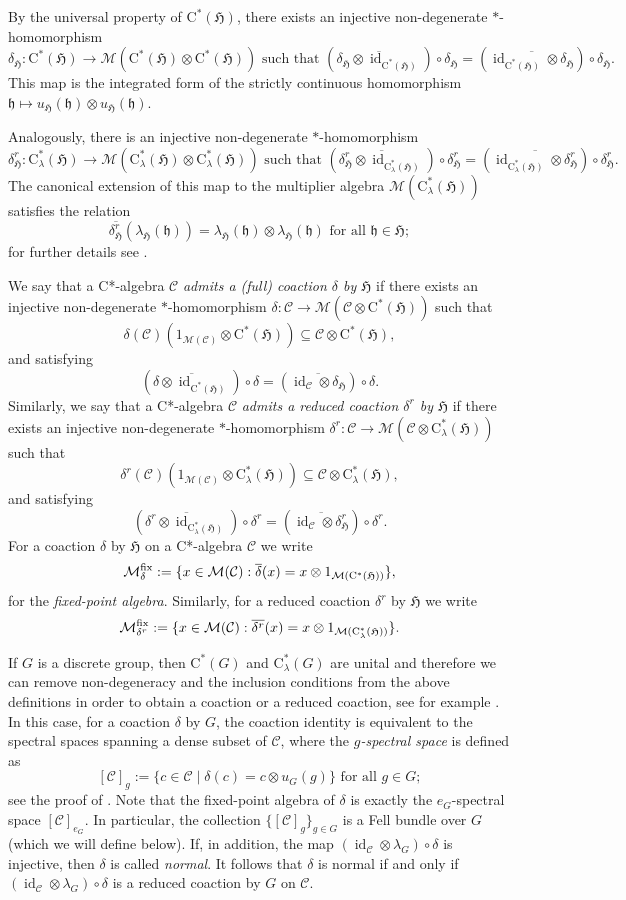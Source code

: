 \documentclass[11pt,final]{amsart}
\numberwithin{equation}{section}
\theoremstyle{plain}
\theoremstyle{definition}
\theoremstyle{remark}
\newcommand{\C}{{\mathcal{C}}}
\newcommand{\M}{{\mathcal{M}}}
\def\de{\delta}
\def\la{\lambda}
\newcommand{\fH}{{\mathfrak{H}}}
\newcommand{\fh}{{\mathfrak{h}}}
\newcommand{\foral}{\text{ for all }}
\newcommand{\ca}{\mathrm{C}^*}
\newcommand{\ol}{\overline}
\newcommand{\id}{{\operatorname{id}}}
\begin{document}
By the universal property of $\ca(\fH)$, there exists an injective non-degenerate $*$-homomorphism
\[
\de_\fH \colon \ca(\fH) \to \M(\ca(\fH) \otimes \ca(\fH)) 
\text{ such that }
(\ol{\de_\fH\otimes \id_{\ca(\fH)}})\circ \de_\fH=(\ol{ \id_{\ca(\fH)} \otimes \de_\fH})\circ \de_\fH.
\]
This map is the integrated form of the strictly continuous homomorphism $\fh \mapsto u_{\fH}(\fh) \otimes u_{\fH}(\fh)$.

Analogously, there is an injective non-degenerate $*$-homomorphism 
\[
\de^r_\fH \colon \ca_\la(\fH) \to \M(\ca_\la(\fH) \otimes \ca_\la(\fH))
\text{ such that }
(\ol{\de^r_\fH\otimes \id_{\ca_\la(\fH)}})\circ \de^r_\fH=(\ol{\id_{\ca_\la(\fH)} \otimes \de^r_\fH})\circ \de^r_\fH.
\]
The canonical extension of this map to the multiplier algebra $\M(\ca_\la(\fH))$ satisfies the relation
\[
\ol{\de^r_\fH}(\la_{\fH}(\fh)) = \la_{\fH}(\fh)\otimes \la_{\fH}(\fh) \foral \fh \in \fH;
\]
for further details see \cite[Pages 141--142]{Kat84}.

We say that a C*-algebra $\C$ \emph{admits a (full) coaction $\de$ by $\fH$} if there exists an injective non-degenerate $*$-homomorphism $\de \colon \C \to \M(\C \otimes \ca(\fH))$ such that 
\[
\de(\C)(1_{\M(\C)}\otimes \ca(\fH)) \subseteq \C\otimes \ca(\fH),
\]
and satisfying
\[
(\ol{\de \otimes \id_{\ca(\fH)}}) \circ \de = (\ol{\id_{\C} \otimes\de_\fH}) \circ \de.
\]
Similarly, we say that a C*-algebra $\C$ \emph{admits a reduced coaction $\de^r$ by $\fH$} if there exists an injective non-degenerate $*$-homomorphism $\de^r \colon \C \to \M(\C \otimes \ca_\la(\fH))$ such that 
\[
\de^r(\C)(1_{\M(\C)}\otimes \ca_\la(\fH)) \subseteq \C\otimes \ca_\la(\fH),
\]
and satisfying
\[
(\ol{\de^r \otimes \id_{\ca_\la(\fH)}}) \circ \de^r = (\ol{\id_{\C} \otimes \de^r_\fH}) \circ \de^r.
\]
For a  coaction $\de$ by $\fH$ on a C*-algebra $\C$ we write
\[
\M^{\rm fix}_\de:=\{x \in \M(\C) : \ol{\de}(x)=x \otimes 1_{\M(\ca(\fH))}\},
\]
for the \emph{fixed-point algebra}.
Similarly, for a reduced coaction $\de^r$ by $\fH$ we write
\[
\M^{\rm fix}_{\de^r}:=\{x \in \M(\C) : \ol{\de^r}(x)=x \otimes 1_{\M(\ca_\la(\fH))}\}.
\]

If $G$ is a discrete group, then $\ca(G)$ and $\ca_\la(G)$ are unital and therefore we can remove non-degeneracy and the inclusion conditions from the above definitions in order to obtain a coaction or a reduced coaction, see for example \cite[Remark 3.2]{DKKLL22}.
In this case, for a coaction $\de$ by $G$, the coaction identity is equivalent to the spectral spaces spanning a dense subset of $\C$, where the \emph{$g$-spectral space} is defined as 
\[
[\C]_g := \{c \in \C \mid \de(c) = c \otimes u_G(g)\} \foral g \in G;
\]
see the proof of \cite[Proposition 2.6]{Ng96}. Note that the fixed-point algebra of $\de$ is exactly the $e_G$-spectral space $[\C]_{e_G}$. In particular, the collection $\{[\C]_g\}_{g\in G}$ is a Fell bundle over $G$ (which we will define below).
If, in addition, the map $(\id_{\C}\otimes \la_G) \circ \de$ is injective, then $\de$ is called \emph{normal}.
It follows that $\de$ is normal if and only if $(\id_{\C}\otimes \la_G) \circ \de$ is a reduced coaction by $G$ on $\C$.
\end{document}
